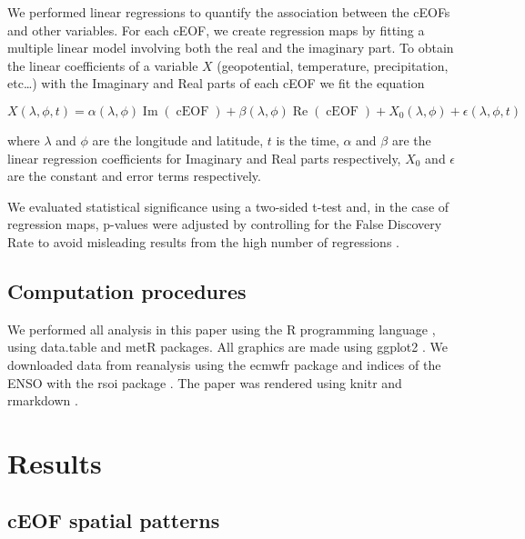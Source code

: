\documentclass[smallextended]{svjour3}       %
\begin{document}
We performed linear regressions to quantify the association between the cEOFs and other variables.
For each cEOF, we create regression maps by fitting a multiple linear model involving both the real and the imaginary part.
To obtain the linear coefficients of a variable \(X\) (geopotential, temperature, precipitation, etc\ldots) with the Imaginary and Real parts of each cEOF we fit the equation

\[
X(\lambda, \phi, t) = \alpha(\lambda, \phi) \operatorname{Im}(\operatorname{cEOF}) + \beta(\lambda, \phi) \operatorname{Re}(\operatorname{cEOF}) + X_0(\lambda, \phi) +  \epsilon(\lambda, \phi, t)
\]

where \(\lambda\) and \(\phi\) are the longitude and latitude, \(t\) is the time, \(\alpha\) and \(\beta\) are the linear regression coefficients for Imaginary and Real parts respectively, \(X_0\) and \(\epsilon\) are the constant and error terms respectively.

We evaluated statistical significance using a two-sided t-test and, in the case of regression maps, p-values were adjusted by controlling for the False Discovery Rate \citep{benjamini1995, wilks2016} to avoid misleading results from the high number of regressions \citep{walker1914, katz1991}.

\hypertarget{computation-procedures}{%
\subsection{Computation procedures}\label{computation-procedures}}

We performed all analysis in this paper using the R programming language \citep{rcoreteam2020}, using data.table \citep{dowle2020} and metR \citep{campitelli2020} packages. All graphics are made using ggplot2 \citep{wickham2009}. We downloaded data from reanalysis using the ecmwfr package \citep{hufkens2020} and indices of the ENSO with the rsoi package \citep{albers2020}. The paper was rendered using knitr and rmarkdown \citep{xie2015, allaire2020}.

\hypertarget{results}{%
\section{Results}\label{results}}

\hypertarget{spatial}{%
\subsection{cEOF spatial patterns}\label{spatial}}
\end{document}
